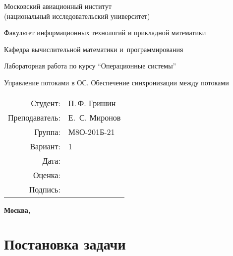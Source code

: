 \documentclass[pdf, unicode, 12pt, a4paper,oneside,fleqn]{article}
\begin{document}
\begin{titlepage}
    \begin{center}
        \bfseries

        {\Large Московский авиационный институт\\ (национальный исследовательский университет)}
        
        \vspace{48pt}
        
        {\large Факультет информационных технологий и прикладной математики}
        
        \vspace{36pt}
        
        {\large Кафедра вычислительной математики и~программирования}
        
        \vspace{48pt}
        
        Лабораторная работа  по курсу \enquote{Операционные системы}

        \vspace{48pt}

        Управление потоками в ОС. Обеспечение синхронизации между потоками
    \end{center}
    
    \vspace{140pt}
    
    \begin{flushright}
    \begin{tabular}{rl}
    Студент: & П.\,Ф. Гришин \\
    Преподаватель: & Е. \,С. Миронов \\
    Группа: & М8О-201Б-21 \\
    Вариант: & 1 \\
    Дата: & \\
    Оценка: & \\
    Подпись: & \\
    \end{tabular}
    \end{flushright}
    
    \vfill
    
    \begin{center}
    \bfseries
    Москва, \the\year
    \end{center}
\end{titlepage}
    
\pagebreak

\section{Постановка задачи}
\end{document}

